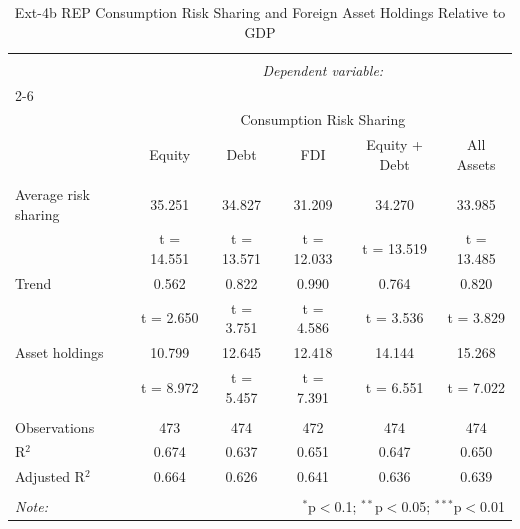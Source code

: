 
\begin{table}[!htbp] \centering 
  \caption{Ext-4b REP Consumption Risk Sharing and Foreign Asset Holdings Relative to GDP} 
  \label{} 
\begin{tabular}{@{\extracolsep{5pt}}lccccc} 
\\[-1.8ex]\hline 
\hline \\[-1.8ex] 
 & \multicolumn{5}{c}{\textit{Dependent variable:}} \\ 
\cline{2-6} 
\\[-1.8ex] & \multicolumn{5}{c}{Consumption Risk Sharing} \\ 
 & Equity & Debt & FDI & Equity + Debt & All Assets \\ 
\hline \\[-1.8ex] 
 Average risk sharing & 35.251 & 34.827 & 31.209 & 34.270 & 33.985 \\ 
  & t = 14.551 & t = 13.571 & t = 12.033 & t = 13.519 & t = 13.485 \\ 
  Trend & 0.562 & 0.822 & 0.990 & 0.764 & 0.820 \\ 
  & t = 2.650 & t = 3.751 & t = 4.586 & t = 3.536 & t = 3.829 \\ 
  Asset holdings & 10.799 & 12.645 & 12.418 & 14.144 & 15.268 \\ 
  & t = 8.972 & t = 5.457 & t = 7.391 & t = 6.551 & t = 7.022 \\ 
 \hline \\[-1.8ex] 
Observations & 473 & 474 & 472 & 474 & 474 \\ 
R$^{2}$ & 0.674 & 0.637 & 0.651 & 0.647 & 0.650 \\ 
Adjusted R$^{2}$ & 0.664 & 0.626 & 0.641 & 0.636 & 0.639 \\ 
\hline 
\hline \\[-1.8ex] 
\textit{Note:}  & \multicolumn{5}{r}{$^{*}$p$<$0.1; $^{**}$p$<$0.05; $^{***}$p$<$0.01} \\ 
\end{tabular} 
\end{table} 
